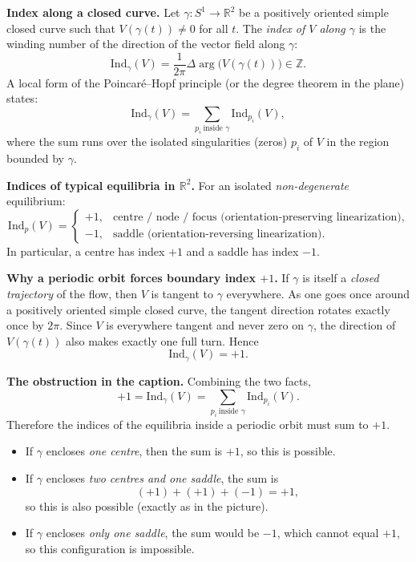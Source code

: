 \documentclass[12pt,a4paper]{article}
\theoremstyle{plain}
\theoremstyle{definition}      %
\begin{document}
	\medskip
	\noindent\textbf{Index along a closed curve.}
	Let $\gamma:S^1\to\mathbb{R}^2$ be a positively oriented simple closed curve such that
	$V(\gamma(t))\neq 0$ for all $t$. The \emph{index of $V$ along $\gamma$} is the winding number
	of the direction of the vector field along $\gamma$:
	\[
	\mathrm{Ind}_\gamma(V)
	=\frac{1}{2\pi}\Delta\arg\bigl(V(\gamma(t))\bigr)\in\mathbb{Z}.
	\]
	A local form of the Poincar\'e--Hopf principle (or the degree theorem in the plane) states:
	\[
	\mathrm{Ind}_\gamma(V)=\sum_{p_i\ \text{inside }\gamma}\mathrm{Ind}_{p_i}(V),
	\]
	where the sum runs over the isolated singularities (zeros) $p_i$ of $V$ in the region
	bounded by $\gamma$.
	
	\medskip
	\noindent\textbf{Indices of typical equilibria in $\mathbb{R}^2$.}
	For an isolated \emph{non-degenerate} equilibrium:
	\[
	\mathrm{Ind}_{p}(V)=
	\begin{cases}
		+1, & \text{centre / node / focus (orientation-preserving linearization)},\\
		-1, & \text{saddle (orientation-reversing linearization)}.
	\end{cases}
	\]
	In particular, a centre has index $+1$ and a saddle has index $-1$.
	
	\medskip
	\noindent\textbf{Why a periodic orbit forces boundary index $+1$.}
	If $\gamma$ is itself a \emph{closed trajectory} of the flow, then $V$ is tangent to $\gamma$
	everywhere. As one goes once around a positively oriented simple closed curve, the tangent
	direction rotates exactly once by $2\pi$. Since $V$ is everywhere tangent and never zero on
	$\gamma$, the direction of $V(\gamma(t))$ also makes exactly one full turn. Hence
	\[
	\mathrm{Ind}_\gamma(V)=+1.
	\]
	
	\medskip
	\noindent\textbf{The obstruction in the caption.}
	Combining the two facts,
	\[
	+1=\mathrm{Ind}_\gamma(V)=\sum_{p_i\ \text{inside }\gamma}\mathrm{Ind}_{p_i}(V).
	\]
	Therefore the indices of the equilibria inside a periodic orbit must sum to $+1$.
	
	\begin{itemize}
		\item If $\gamma$ encloses \emph{one centre}, then the sum is $+1$, so this is possible.
		\item If $\gamma$ encloses \emph{two centres and one saddle}, the sum is
		\[
		(+1)+(+1)+(-1)=+1,
		\]
		so this is also possible (exactly as in the picture).
		\item If $\gamma$ encloses \emph{only one saddle}, the sum would be $-1$, which cannot equal $+1$,
		so this configuration is impossible.
	\end{itemize}
	
\end{document}
